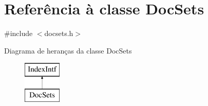 \hypertarget{class_doc_sets}{\section{Referência à classe Doc\-Sets}
\label{class_doc_sets}
}


{\ttfamily \#include $<$docsets.\-h$>$}

Diagrama de heranças da classe Doc\-Sets\begin{figure}[H]
\begin{center}
\leavevmode
\includegraphics[height=2.000000cm]{class_doc_sets}
\end{center}
\end{figure}
